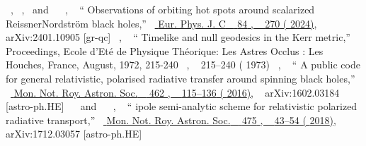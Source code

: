 \documentclass[aps,reprint,superscriptaddress,nofootinbib,floatfix,longbibliography,preprintnumbers]{revtex4-1}
\begin{document}
\begin{thebibliography}{139}
  \BibitemOpen
   { { \  },  { \  },  \  and \   { \  }, \  } {\enquote { {{Observations of orbiting hot spots around scalarized Reissner\textendash{}Nordstr\"{o}m black holes}},} \  }\href {\doibase 10.1140/epjc/s10052-024-12635-7} { { {Eur. Phys. J. C} \  }  {84} , \   {270} ( {2024}{})}, \   {arXiv:2401.10905 [gr-qc]} 
  \BibitemOpen
   { { \  }, \  } {\enquote { {{Timelike and null geodesics in the Kerr metric}},} \  }\href@noop {} { { {Proceedings, Ecole d'Et\'{e} de Physique Th\'{e}orique: Les Astres Occlus : Les Houches, France, August, 1972, 215-240} \  , \   {215--240}} ( {1973})}
  \BibitemOpen
   { { \  }, \  } {\enquote { {{A public code for general relativistic, polarised radiative transfer around spinning black holes}},} \  }\href {\doibase 10.1093/mnras/stw1526} { { {Mon. Not. Roy. Astron. Soc.} \  }  {462} , \   {115--136} ( {2016})}, \   {arXiv:1602.03184 [astro-ph.HE]} 
  \BibitemOpen
   { { \  } \  and \   { \  }, \  } {\enquote { {{ipole \textendash{} semi-analytic scheme for relativistic polarized radiative transport}},} \  }\href {\doibase 10.1093/mnras/stx3162} { { {Mon. Not. Roy. Astron. Soc.} \  }  {475} , \   {43--54} ( {2018})}, \   {arXiv:1712.03057 [astro-ph.HE]} 

\end{thebibliography}
\end{document}
